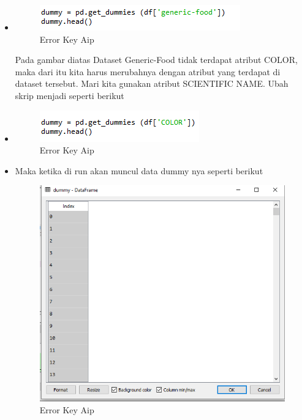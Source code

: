 \begin{itemize}
\item
\begin{figure}[!hbtp]
\centering
\includegraphics[scale=0.5]{figures/AIP/errorc2.PNG}
\caption{Error Key Aip}
\label{Error}
\end{figure}
Pada gambar diatas Dataset Generic-Food tidak terdapat atribut COLOR, maka dari itu kita harus merubahnya dengan atribut yang terdapat di dataset tersebut. Mari kita gunakan atribut SCIENTIFIC NAME. Ubah skrip menjadi seperti berikut
\item
\begin{figure}[!hbtp]
\centering
\includegraphics[scale=0.5]{figures/AIP/errorc3.PNG}
\caption{Error Key Aip}
\label{Error}
\end{figure}
\item Maka ketika di run akan muncul data dummy nya seperti berikut
\begin{figure}[!hbtp]
\centering
\includegraphics[scale=0.5]{figures/AIP/errorc4.PNG}
\caption{Error Key Aip}
\label{Error}
\end{figure}
\end{itemize}




